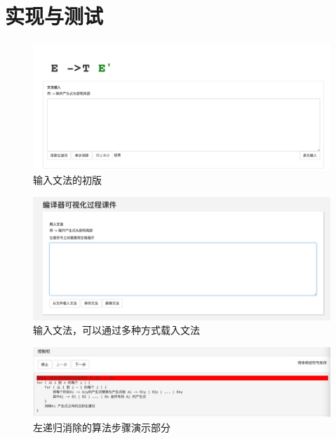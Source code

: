 \section{实现与测试}
\begin{figure}[!htb]
	\centering
	\includegraphics[width=1\linewidth]{img/grammarinput2.jpg}
	\caption{输入文法的初版}
	\label{fig:grammarinput2.jpg}
\end{figure}

\begin{figure}[!htb]
	\centering
	\includegraphics[width=1\linewidth]{img/grammarinput3.jpg}
	\caption{输入文法，可以通过多种方式载入文法}
	\label{fig:grammarinput3.jpg}
\end{figure}

\begin{figure}[!htb]
	\centering
	\includegraphics[width=1\linewidth]{img/leftrecursive2.png}
	\caption{左递归消除的算法步骤演示部分}
	\label{fig:leftrecursive2.png}
\end{figure}

